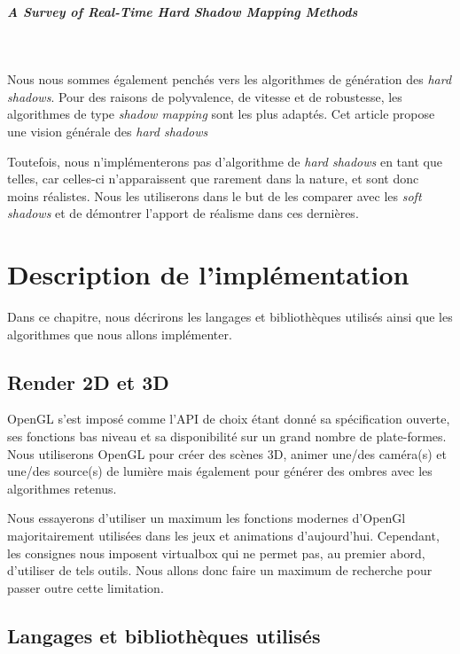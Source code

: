 \documentclass[a4paper,10pt]{report}
\begin{document}
\paragraph{\large A Survey of Real-Time Hard Shadow Mapping Methods}
~~\\
\cite{scherzer2011survey}

Nous nous sommes également penchés vers les algorithmes de génération des \textit{hard shadows}. Pour des raisons de polyvalence, de vitesse et de robustesse, les algorithmes de type \textit{shadow mapping} sont les plus adaptés. Cet article propose une vision générale des \textit{hard shadows}

Toutefois, nous n'implémenterons pas d'algorithme de \textit{hard shadows} en tant que telles, car celles-ci n'apparaissent que rarement dans la nature, et sont donc moins réalistes. Nous les utiliserons dans le but de les comparer avec les \textit{soft shadows} et de démontrer l'apport de réalisme dans ces dernières.


\chapter{Description de l’implémentation}

Dans ce chapitre, nous décrirons les langages et bibliothèques utilisés ainsi que les algorithmes que nous allons implémenter.

\section{Render 2D et 3D}
OpenGL s'est imposé comme l'API de choix étant donné sa spécification ouverte, ses fonctions bas niveau et sa disponibilité sur un grand nombre de plate-formes.
Nous utiliserons OpenGL pour créer des scènes 3D, animer une/des caméra(s) et une/des source(s) de lumière mais également pour générer des ombres avec les algorithmes retenus.

Nous essayerons d'utiliser un maximum les fonctions modernes d'OpenGl majoritairement utilisées dans les jeux et animations d'aujourd'hui. Cependant, les consignes nous imposent virtualbox qui ne permet pas, au premier abord, d'utiliser de tels outils. Nous allons donc faire un maximum de recherche pour passer outre cette limitation.

\section{Langages et bibliothèques utilisés}
\end{document}
